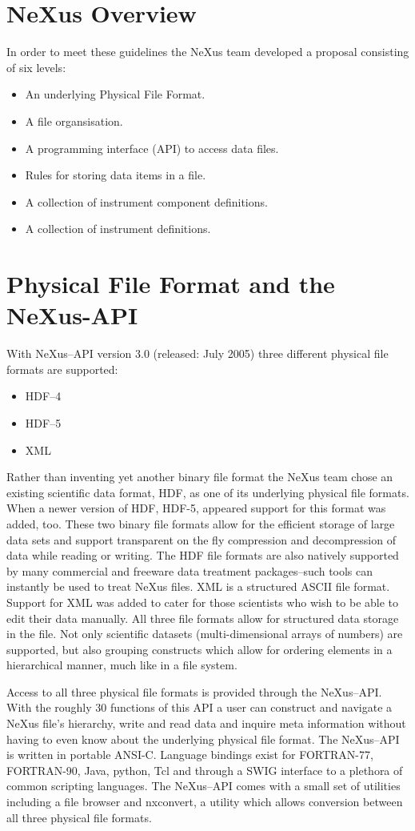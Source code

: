 \section{NeXus Overview}
In order to meet these guidelines the NeXus team developed a proposal
consisting of six levels:
\begin{itemize}
\item An underlying Physical File Format.
\item A file organsisation.
\item A programming interface (API) to access data files.
\item Rules for storing data items in a file.
\item A collection of instrument component definitions.
\item A collection of instrument definitions.
\end{itemize}

\section{Physical File Format and the NeXus-API}
With NeXus--API version 3.0 (released: July 2005) three different
physical file formats are supported:
\begin{itemize}
\item HDF--4\cite{hdf4}
\item HDF--5\cite{hdf5}
\item XML
\end{itemize}
Rather than inventing yet another binary file format the NeXus team
chose an existing scientific data format, HDF, as one of its
underlying physical file formats. When a newer version of HDF, HDF-5,
appeared support for this format was added, too. These two binary file
formats allow for the efficient storage of large data sets and support
transparent on the fly compression and decompression of data while
reading or writing. The HDF file formats are also natively supported by many
commercial and freeware data treatment packages--such tools can
instantly be used to treat NeXus files. XML is a structured ASCII file
format. Support for XML was added to cater for those
scientists who wish to be able to edit their data manually. All three
file formats allow for structured data storage in the file. Not only
scientific datasets (multi-dimensional arrays of numbers) are
supported, but also grouping constructs which allow for ordering
elements in a hierarchical manner, much like in a file system.


Access to all three physical file formats is provided through the
NeXus--API. With the roughly 30 functions of this API a user can
construct and navigate a NeXus file's hierarchy, write and read data and
inquire meta information without having to even know about the
underlying physical file format. The NeXus--API is written in portable
ANSI-C. Language bindings exist for FORTRAN-77, FORTRAN-90, Java,
python, Tcl and through a SWIG\cite{swig} interface to a plethora of
common scripting languages. The NeXus--API comes with a small set of
utilities including a file browser and nxconvert, a utility which
allows conversion between all three physical file formats.  
     
